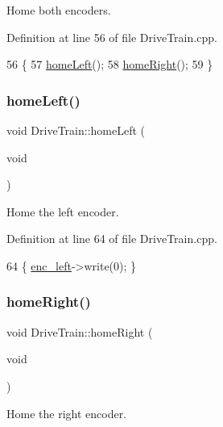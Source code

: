 Home both encoders. 



Definition at line 56 of file Drive\+Train.\+cpp.


\begin{DoxyCode}
56                                   \{
57     \hyperlink{class_drive_train_a1ef100b1637bdefca2634ff8b28b41d7}{homeLeft}();
58     \hyperlink{class_drive_train_ad4a50d49f7bf22ea5b35c7d63b6e7736}{homeRight}();
59 \}
\end{DoxyCode}
\mbox{\label{class_drive_train_a1ef100b1637bdefca2634ff8b28b41d7}} 
\subsubsection{\texorpdfstring{home\+Left()}{homeLeft()}}
{\footnotesize\ttfamily void Drive\+Train\+::home\+Left (\begin{DoxyParamCaption}\item[{void}]{ }\end{DoxyParamCaption})}



Home the left encoder. 



Definition at line 64 of file Drive\+Train.\+cpp.


\begin{DoxyCode}
64 \{ \hyperlink{class_drive_train_ab0a54aaa4484970b6890a7c8ebaadf3b}{enc\_left}->write(0); \}
\end{DoxyCode}
\mbox{\label{class_drive_train_ad4a50d49f7bf22ea5b35c7d63b6e7736}} 
\subsubsection{\texorpdfstring{home\+Right()}{homeRight()}}
{\footnotesize\ttfamily void Drive\+Train\+::home\+Right (\begin{DoxyParamCaption}\item[{void}]{ }\end{DoxyParamCaption})}



Home the right encoder. 



